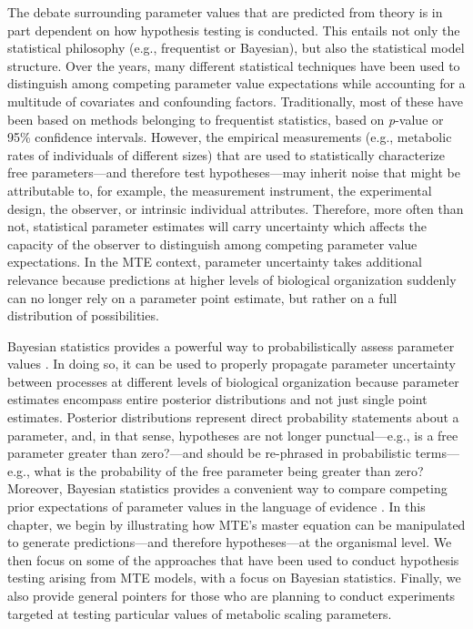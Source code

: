 \documentclass[a4paper,12pt]{article}
\begin{document}
The debate surrounding parameter values that are predicted from theory is in part dependent on how hypothesis testing is conducted. This entails not only the statistical philosophy (e.g., frequentist or Bayesian), but also the statistical model structure. Over the years, many different statistical techniques have been used to distinguish among competing parameter value expectations while accounting for a multitude of covariates and confounding factors. Traditionally, most of these have been based on methods belonging to frequentist statistics, based on \emph{p}-value or 95\% confidence intervals. However, the empirical measurements (e.g., metabolic rates of individuals of different sizes) that are used to statistically characterize free parameters---and therefore test hypotheses---may inherit noise that might be attributable to, for example, the measurement instrument, the experimental design, the observer, or intrinsic individual attributes. Therefore, more often than not, statistical parameter estimates will carry uncertainty which affects the capacity of the observer to distinguish among competing parameter value expectations. In the MTE context, parameter uncertainty takes additional relevance because predictions at higher levels of biological organization suddenly can no longer rely on a parameter point estimate, but rather on a full distribution of possibilities.

Bayesian statistics provides a powerful way to probabilistically assess parameter values \citep{kruscke2018psybullrev,gelman2020book}. In doing so, it can be used to properly propagate parameter uncertainty between processes at different levels of biological organization \citep[not discussed here, but see e.g.,][for examples that are relevant to MTE]{barneche2014ele, barneche2016procb} because parameter estimates encompass entire posterior distributions and not just single point estimates. Posterior distributions represent direct probability statements about a parameter, and, in that sense, hypotheses are not longer punctual---e.g., is a free parameter greater than zero?---and should be re-phrased in probabilistic terms---e.g., what is the probability of the free parameter being greater than zero? Moreover, Bayesian statistics provides a convenient way to compare competing prior expectations of parameter values in the language of evidence \citep{benjamin2017nathumbeh,
lakens2022tree}. In this chapter, we begin by illustrating how MTE's master equation can be manipulated to generate predictions---and therefore hypotheses---at the organismal level. We then focus on some of the approaches that have been used to conduct hypothesis testing arising from MTE models, with a focus on Bayesian statistics. Finally, we also provide general pointers for those who are planning to conduct experiments targeted at testing particular values of metabolic scaling parameters.
\end{document}

